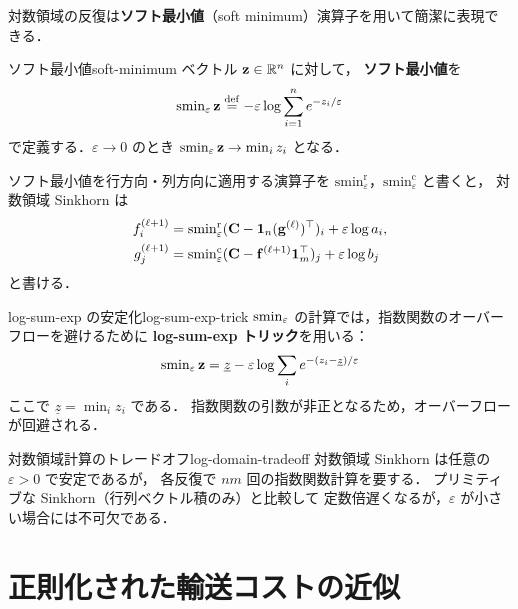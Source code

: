 対数領域の反復は\textbf{ソフト最小値}（soft minimum）演算子を用いて簡潔に表現できる．

\begin{definition}{ソフト最小値}{soft-minimum}
  ベクトル $\mathbf{z} \in \mathbb{R}^n$ に対して，
  \textbf{ソフト最小値}を
  \[
    \operatorname{smin}_\varepsilon \mathbf{z}
    \overset{\mathrm{def}}{=} -\varepsilon \log \sum_{i=1}^n e^{-z_i / \varepsilon}
  \]
  で定義する．$\varepsilon \to 0$ のとき $\operatorname{smin}_\varepsilon \mathbf{z} \to \min_i z_i$ となる．
\end{definition}

ソフト最小値を行方向・列方向に適用する演算子を
$\mathrm{smin}^{\mathrm{r}}_\varepsilon$，$\mathrm{smin}^{\mathrm{c}}_\varepsilon$ と書くと，
対数領域 Sinkhorn は
\begin{align*}
  f_i^{(\ell+1)}
    &= \mathrm{smin}^{\mathrm{r}}_\varepsilon
    (\mathbf{C} - \mathbf{1}_n (\mathbf{g}^{(\ell)})^\top)_i + \varepsilon \log a_i,
  \\
  g_j^{(\ell+1)}
    &= \mathrm{smin}^{\mathrm{c}}_\varepsilon
    (\mathbf{C} - \mathbf{f}^{(\ell+1)} \mathbf{1}_m^\top)_j + \varepsilon \log b_j
\end{align*}
と書ける．

\begin{remark}{log-sum-exp の安定化}{log-sum-exp-trick}
  $\operatorname{smin}_\varepsilon$ の計算では，指数関数のオーバーフローを避けるために
  \textbf{log-sum-exp トリック}を用いる：
  \[
    \operatorname{smin}_\varepsilon \mathbf{z}
    = \underline{z} - \varepsilon \log \sum_i e^{-(z_i - \underline{z})/\varepsilon}
  \]
  ここで $\underline{z} = \min_i z_i$ である．
  指数関数の引数が非正となるため，オーバーフローが回避される．
\end{remark}

\begin{remark}{対数領域計算のトレードオフ}{log-domain-tradeoff}
  対数領域 Sinkhorn は任意の $\varepsilon > 0$ で安定であるが，
  各反復で $nm$ 回の指数関数計算を要する．
  プリミティブな Sinkhorn（行列ベクトル積のみ）と比較して
  定数倍遅くなるが，$\varepsilon$ が小さい場合には不可欠である．
\end{remark}

\section{正則化された輸送コストの近似}
\label{sec:sinkhorn-divergence}

